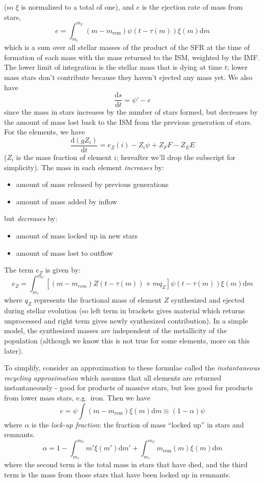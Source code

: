 \documentclass{article}
\begin{document}
(so $\xi$ is normalized to a total of one), and $e$ is the
ejection rate of mass from stars,
\[
    e = \int_{m_{t}}^{m_{U}}{
        \left(m-m_{\mathrm{rem}}\right)\psi\left(t-\tau(m)\right)
        \xi\left(m\right)\mathrm{d}m}
    \]
which is a sum over all stellar masses of the product of the SFR at the time of
formation of each mass with the mass returned to the ISM, weighted by the
IMF\@. The lower limit of integration is the stellar mass that is dying at
time $t$; lower mass stars don't contribute because they haven't ejected any
mass yet. We also have
\[
    \frac{\mathrm{d}s}{\mathrm{d}t} = \psi' - e
    \]
since the mass in stars increases by the number of stars formed, but decreases
by the amount of mass lost back to the ISM from the previous generation of
stars. For the elements, we have
\[
    \frac{\mathrm{d}(gZ_{i})}{\mathrm{d}t} =
    e_{Z}(i) - Z_{i}\psi + Z_{F}F - Z_{E}E
    \]
($Z_{i}$ is the mass fraction of element $i$; hereafter we'll drop
the subscript for simplicity). The mass in each element \emph{increases} by:
\begin{itemize}
    \item amount of mass released by previous generations
    \item amount of mass added by inflow
\end{itemize}
but \emph{decreases} by:
\begin{itemize}
    \item amount of mass locked up in new stars
    \item amount of mass lost to outflow
\end{itemize}
The term $e_{Z}$ is given by:
\[
    e_{Z} = \int_{m_{\tau}}^{m_{U}}{
        \left[(m-m_{rem})Z(t-\tau(m))+mq_{Z}\right]
        \psi(t-\tau(m))\xi(m)\textrm{d}m}
    \]
where $q_{Z}$ represents the fractional mass of element $Z$ synthesized and
ejected during stellar evolution (so left term in brackets gives material which
returns unprocessed and right term gives newly synthesized contribution).  In a
simple model, the synthesized masses are independent of the metallicity of the
population (although we know this is not true for some elements, more on this
later).

To simplify, consider an approximation to these formulae called the
\textit{instantaneous recycling approximation} which assumes that all elements
are returned instantaneously - good for products of massive stars, but less
good for products from lower mass stars, e.g.\ iron. Then we have
\[
    e = \psi\int{(m-m_{\textrm{rem}})\xi(m)\textrm{d}m}
    \equiv (1-\alpha)\psi
    \]
where $\alpha$ is the \textit{lock-up fraction}: the fraction
of mass ``locked up'' in stars and remnants.
\[
    \alpha = 1-\int_{m_{\tau}}^{m_{U}}{{m'}\xi(m')\mathrm{d}{m'}} +
    \int_{m_{\tau}}^{m_{U}}{m_{\mathrm{rem}}(m)\xi(m)\mathrm{d}m}
    \]
where the second term is the total mass in stars that have died, and
the third term is the mass from those stars that have been locked up
in remnants.
\end{document}
